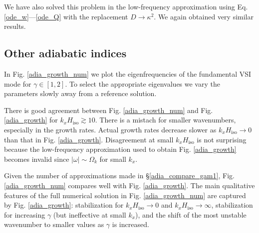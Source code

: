 We have also solved this problem in the low-frequency approximation
using Eq. \ref{ode_w}---\ref{ode_Q} with the replacement
$D\to\kappa^2$. We again obtained very similar results. 


\subsection{Other adiabatic indices}
In Fig. \ref{adia_growth_num} we plot the eigenfrequencies of the
fundamental VSI mode for $\gamma\in[1,2]$. To select the appropriate
eigenvalues we vary the parameters slowly away from a reference solution.   

There is good agreement between Fig. \ref{adia_growth_num} and
Fig. \ref{adia_growth} for $k_xH_\mathrm{iso}\gtrsim10$. There is a
mistach for smaller wavenumbers, especially in the growth
rates. Actual growth rates decrease slower as $k_xH_\mathrm{iso}\to0$
than that in Fig. \ref{adia_growth}. Disagreement at small
$k_xH_\mathrm{iso}$ is not surprising because the low-frequency
approximation used to obtain Fig. \ref{adia_growth} becomes invalid since
$|\omega|\sim\Omega_k$ for small $k_x$. 

Given the number of approximations made in \S\ref{adia_compare_gam1},
Fig. \ref{adia_growth_num} compares well with
Fig. \ref{adia_growth}. The main qualitative features of the full
numerical solution in Fig. \ref{adia_growth_num} are captured by
Fig. \ref{adia_growth}: stabilization for
$k_xH_\mathrm{iso}\to0$ and $k_xH_\mathrm{iso}\to\infty$,
stabilization for increasing $\gamma$ (but ineffective at small $k_x$), 
and the shift of the most unstable wavenumber to smaller values as
$\gamma$ is increased. 


